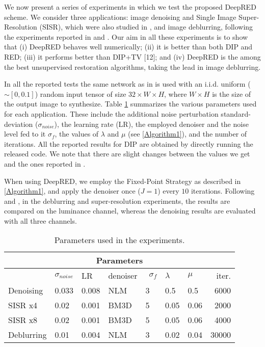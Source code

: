 \documentclass[12pt]{article}
\begin{document}
We now present a series of experiments in which we test the proposed DeepRED scheme. We consider three applications: image denoising and Single Image Super-Resolution (SISR), which were also studied in \cite{DIP-2018}, and image deblurring, following the experiments reported in \cite{RED-2017} and \cite{multi}. Our aim in all these experiments is to show that (i) DeepRED behaves well numerically; (ii) it is better than both DIP and RED; (iii) it performs better than DIP+TV [12]; and (iv) DeepRED is the among the best unsupervised restoration algorithms, taking the lead in image deblurring. 

In all the reported tests the same network as in \cite{DIP-2018} is used with an i.i.d. uniform ($\sim [0,0.1]$) random input tensor of size $32\times W \times H$, where $W \times H$ is the size of the output image to synthesize. Table \ref{Tab:params} summarizes the various parameters used for each application. These include the additional noise perturbation standard-deviation ($\sigma_{noise}$), the learning rate (LR), the employed denoiser and the noise level fed to it $\sigma_f$, the values of $\lambda$ and $\mu$ (see \ref{Algorithm1}), and the number of iterations. All the reported results for DIP are obtained by directly running the released code. We note that there are slight changes between the values we get and the ones reported in \cite{DIP-2018}. 

When using DeepRED, we employ the Fixed-Point Strategy as described in \ref{Algorithm1}, and apply the denoiser once ($J=1$) every $10$ iterations. Following \cite{DIP-2018} and \cite{NCSR}, in the deblurring and super-resolution experiments, the results are compared on the luminance channel, whereas the denoising results are evaluated with all three channels. 

\begin{table}[htbp]
\centering
 \footnotesize\addtolength{\tabcolsep}{-5pt}
\begin{tabularx}{\linewidth}{|l||X X X X X X r|}
\hline
 \multicolumn{8}{|c|}{Parameters} \\
 \hline
& $\sigma_{noise}$ & LR & denoiser & $~~\sigma_f$ & $\lambda$ & $\mu$ & iter. \\ [0.5ex] 
 \hline
Denoising & 0.033 & 0.008 & NLM & 3 & 0.5 & 0.5 & 6000  \\
SISR x4 & 0.02 & 0.001 & BM3D & 5 &  0.05 & 0.06 & 2000 \\
SISR x8 & 0.02 & 0.001 & BM3D & 5 &  0.05 & 0.06 & 4000 \\
Deblurring & 0.01 & 0.004 & NLM & 3 &  0.02 & 0.04 & 30000 \\
\hline
\end{tabularx}
\caption{Parameters used in the experiments.}
 \label{Tab:params}
\end{table}
\end{document}
